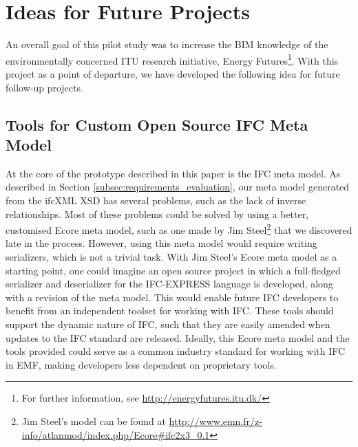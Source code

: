 
\section{Ideas for Future Projects}
\label{sec:plan_for_future_projects}
An overall goal of this pilot study was to increase the BIM knowledge of the environmentally concerned ITU research initiative, Energy Futures\footnote{For further information, see \url{http://energyfutures.itu.dk/}}. With this project as a point of departure, we have developed the following idea for future follow-up projects.

\subsection{Tools for Custom Open Source IFC Meta Model}
At the core of the prototype described in this paper is the IFC meta model. As described in Section \ref{subsec:requirements_evaluation}, our meta model generated from the ifcXML XSD has several problems, such as the lack of inverse relationships. Most of these problems could be solved by using a better, customised Ecore meta model, such as one made by Jim Steel\footnote{Jim Steel's model can be found at \url{http://www.emn.fr/z-info/atlanmod/index.php/Ecore#ifc2x3_0.1}} that we discovered late in the process. However, using this meta model would require writing serializers, which is not a trivial task. With Jim Steel's Ecore meta model as a starting point, one could imagine an open source project in which a full-fledged serializer and deserializer for the IFC-EXPRESS language is developed, along with a revision of the meta model. This would enable future IFC developers to benefit from an independent toolset for working with IFC. These tools should support the dynamic nature of IFC, such that they are easily amended when updates to the IFC standard are released. Ideally, this Ecore meta model and the tools provided could serve as a common industry standard for working with IFC in EMF, making developers less dependent on proprietary tools.

